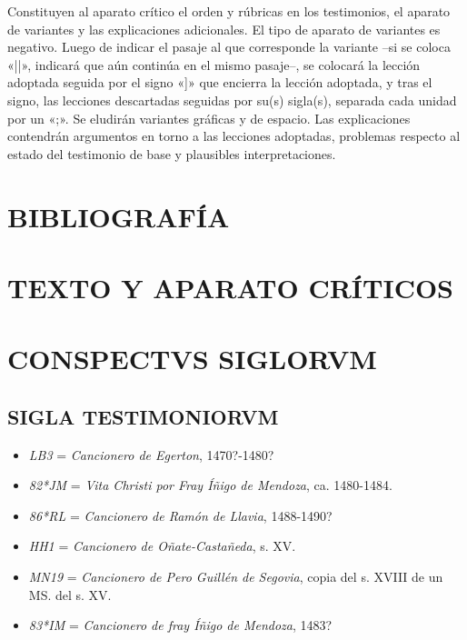 \documentclass[11pt,a4paper,twoside]{article}
\newcommand{\comillas}[1]{«#1»}
\begin{document}
%
Constituyen al aparato crítico el orden y rúbricas en los testimonios, el aparato de variantes y las explicaciones adicionales. El tipo de aparato de variantes es negativo. Luego de indicar el pasaje al que corresponde la variante --si se coloca \comillas{||}, indicará que aún continúa en el mismo pasaje--, se colocará la lección adoptada seguida por el signo \comillas{]} que encierra la lección adoptada, y tras el signo, las lecciones descartadas seguidas por su(s) sigla(s), separada cada unidad por un \comillas{;}. Se eludirán variantes gráficas y de espacio. Las explicaciones contendrán argumentos en torno a las lecciones adoptadas, problemas respecto al estado del testimonio de base y plausibles interpretaciones.\par

\section*{\centering\fontsize{11}{14}\selectfont BIBLIOGRAFÍA}
\nocite{*}
\printbibliography[heading=none]
\newpage

\section*{\centering\fontsize{13}{14}\selectfont TEXTO Y APARATO CRÍTICOS}
\newpage

\section*{\centering\fontsize{11}{14.35}\selectfont CONSPECTVS SIGLORVM}

\subsection*{\centering\fontsize{9.5}{12}\selectfont SIGLA TESTIMONIORVM}
\vspace*{-2.5pt}
\begin{itemize}[label=,leftmargin=0.6cm]%
\item \emph{LB3} = \emph{Cancionero de Egerton}, 1470?-1480?
\item \emph{82*JM} = \emph{Vita Christi por Fray Íñigo de Mendoza}, ca. 1480-1484.
\item \emph{86*RL} = \emph{Cancionero de Ramón de Llavia}, 1488-1490?
\item \emph{HH1} = \emph{Cancionero de Oñate-Castañeda}, s. XV.
\item \emph{MN19} = \emph{Cancionero de Pero Guillén de Segovia}, copia del s. XVIII de un MS. del s. XV.
\item \emph{83*IM} = \emph{Cancionero de fray Íñigo de Mendoza}, 1483?%
\end{itemize}
\end{document}

